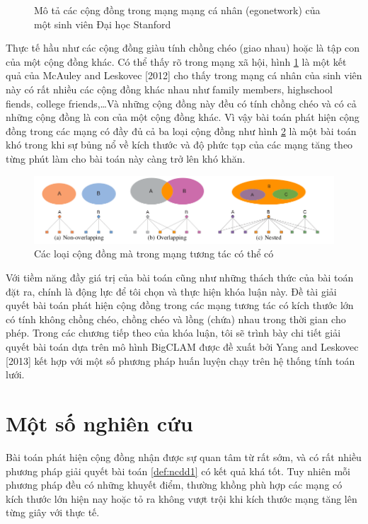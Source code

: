 \begin{figure}[h]
\begin{minipage}[b]{0.58\textwidth}
		\caption{Mô tả các cộng đồng trong mạng mạng cá nhân (egonetwork) của một sinh viên Đại học Stanford}
		\label{fig:overlapcommunity}
	\end{minipage}    
\end{figure}

Thực tế hầu như các cộng đồng giàu tính chồng chéo (giao nhau) hoặc là tập con của một cộng đồng khác. Có thể thấy rõ trong mạng xã hội, hình \ref{fig:overlapcommunity} là một kết quả của McAuley and
Leskovec [2012] \cite{DBLP2journals2corr2abs2121028182} cho thấy trong mạng cá nhân của sinh viên này có rất nhiều các cộng đồng khác nhau như family members, highschool fiends, college friends,\dots Và những cộng đồng này đều có tính chồng chéo và có cả những cộng đồng là con của một cộng đồng khác. Vì vậy bài toán phát hiện cộng đồng trong các mạng có đầy đủ cả ba loại cộng đồng như hình \ref{fig:typeofcommunity} là một bài toán khó trong khi sự bủng nổ về kích thước và độ phức tạp của các mạng tăng theo từng phút làm cho bài toán này càng trở lên khó khăn.

\begin{figure}[h]
	\centering
	\includegraphics[width=\linewidth]{Chapter1/Chapter1Figs/typeofcommunity}
	\caption{Các loại cộng đồng mà trong mạng tương tác có thể có}
	\label{fig:typeofcommunity}
\end{figure}

Với tiềm năng đầy giá trị của bài toán cũng như những thách thức của bài toán đặt ra, chính là động lực để tôi chọn và thực hiện khóa luận này. Đề tài giải quyết bài toán phát hiện cộng đồng trong các mạng tương tác có kích thước lớn có tính không chồng chéo, chồng chéo và lồng (chứa) nhau trong thời gian cho phép. Trong các chương tiếp theo của khóa luận, tôi sẽ trình bày chi tiết giải quyết bài toán dựa trên mô hình BigCLAM được đề xuất bởi Yang and
Leskovec [2013] \cite{yang2013overlapping} kết hợp với một số phương pháp huấn luyện chạy trên hệ thống tính toán lưới.

\section{Một số nghiên cứu}
Bài toán phát hiện cộng đồng nhận được sự quan tâm từ rất sớm, và có rất nhiều phương pháp giải quyết bài toán \ref{def:ncdd1} có kết quả khá tốt. Tuy nhiên mỗi phương pháp đều có những khuyết điểm, thường khồng phù hợp các mạng có kích thước lớn hiện nay hoặc tỏ ra không vượt trội khi kích thước mạng tăng lên từng giây với thực tế.

